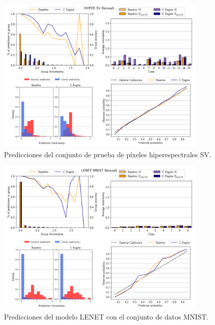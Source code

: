 \begin{figure}[ht]
    \centering
    \includegraphics[width=0.9\textwidth]{root/Imagenes/anexo/Bernoulli-HYPER_SV-mosaic.png}
    \caption{Predicciones del conjunto de prueba de píxeles hiperespectrales SV.}
    \label{fig:anx-Bernoulli-HYPER_SV}
\end{figure}


\begin{figure}[ht]
    \centering
    \includegraphics[width=0.9\textwidth]{root/Imagenes/anexo/Bernoulli-LENET_MNIST-mosaic.png}
    \caption{Predicciones del modelo LENET con el conjunto de datos MNIST.}
    \label{fig:anx-Bernoulli-LENET_MNIST}
\end{figure}


